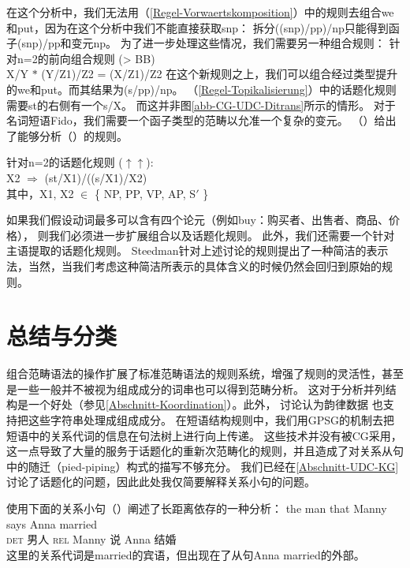 在这个分析中，我们无法用（\ref{Regel-Vorwaertskomposition}）中的规则去组合we和put，因为在这个分析中我们不能直接获取s\bs np：
拆分((s\bs np)/pp)/np只能得到函子(s\bs np)/pp和变元np。
为了进一步处理这些情况，我们需要另一种组合规则：
\ea
针对n=2的前向组合规则 (> BB)\\
X/Y $*$ (Y/Z1)/Z2 = (X/Z1)/Z2
\z
在这个新规则之上，我们可以组合经过类型提升的we和put。而其结果为(s/pp)/np。
（\ref{Regel-Topikalisierung}）中的话题化规则需要st的右侧有一个s/X。
而这并非图\ref{abb-CG-UDC-Ditrans}所示的情形。
对于名词短语Fido，我们需要一个函子类型的范畴以允准一个复杂的变元。
（）给出了能够分析（）的规则。

\ea
\label{Regel-Topikalisierung-zwei}
针对n=2的话题化规则
 ($\uparrow\uparrow$\isc{$\uparrow\uparrow$}\is{$\uparrow\uparrow$}):\\
X2 $\Rightarrow$ (st/X1)/((s/X1)/X2)\\
其中，X1, X2 $\in$ \{ NP, PP, VP, AP, S$'$ \}
\z

\noindent
如果我们假设动词最多可以含有四个论元（例如buy：购买者、出售者、商品、价格），
则我们必须进一步扩展组合以及话题化规则。
此外，我们还需要一个针对主语提取的话题化规则\citep[]{Pollard88a}。
Steedman针对上述讨论的规则提出了一种简洁的表示法，当然，当我们考虑这种简洁所表示的具体含义的时候仍然会回归到原始的规则。 

\section{总结与分类}
\label{Abschnitt-Relativsaetze-CG}\label{Abschnitt-Ratte-CG}\label{sec-pied-piping-cg}

组合范畴语法的操作扩展了标准范畴语法的规则系统，增强了规则的灵活性，甚至是一些一般并不被视为组成成分的词串也可以得到范畴分析。
这对于分析并列结构是一个好处（参见\ref{Abschnitt-Koordination}）。此外， \citet{Steedman91a}讨论认为韵律数据
也支持把这些字符串处理成组成成分。
在短语结构规则中，我们用GPSG的机制去把短语中的关系代词的信息在句法树上进行向上传递。
这些技术并没有被CG采用，这一点导致了大量的服务于话题化的重新次范畴化的规则，并且造成了对关系从句中的随迁（pied-piping）构式的描写不够充分。
我们已经在\ref{Abschnitt-UDC-KG}讨论了话题化的问题，因此此处我仅简要解释关系小句的问题。

 \citet[]{SB2006a-u}使用下面的关系小句（）阐述了长距离依存的一种分析：
\ea
\gll the man  that Manny says Anna married \\
     \textsc{det} 男人 \textsc{rel} Manny 说 Anna 结婚 \\
\z
这里的关系代词是married的宾语，但出现在了从句Anna married的外部。

